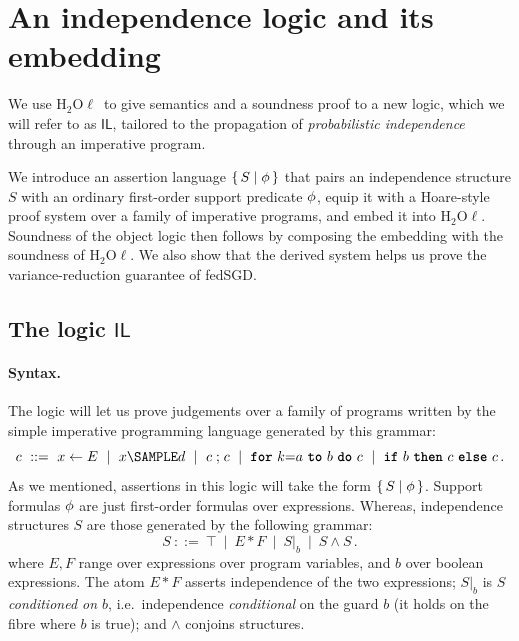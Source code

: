 \documentclass[11pt]{article}
\providecommand{\hoellora}{\textsf{H$\mbox{}_2$O$\ell$}\xspace}
\newcommand{\iHL}{\ensuremath{\mathsf{IL}}\xspace}   %
\newcommand{\iat}{\mathbin{\ast}}                 %
\newcommand{\smpl}{\SAMPLE}
\newcommand{\stp}{\mathrel{;}}
\newcommand{\restr}[2]{#1|_{#2}}                  %
\theoremstyle{plain}\newtheorem{lemma}{Lemma}\newtheorem{theorem}{Theorem}\newtheorem{corollary}{Corollary}
\theoremstyle{definition}\newtheorem{definition}{Definition}
\begin{document}
\section{An independence logic and its embedding}
\label{sec:il}

We use \hoellora\ to give semantics
and a soundness proof to a new logic, which we will refer to as \iHL, tailored to 
the propagation of \emph{probabilistic independence} through an imperative program. 

We introduce an
assertion language $\{\,S \mid \phi\,\}$ that pairs an independence structure
$S$ with an ordinary first-order support predicate $\phi$, equip it with a
Hoare-style proof system over a family of imperative programs, and embed it into
\hoellora. Soundness of the object logic 
then follows by composing the embedding
with the soundness of \hoellora. We also show that the derived
system helps us prove the variance-reduction guarantee of fedSGD.


\subsection{The logic \iHL}

\paragraph{Syntax.}
The logic will let us prove judgements over a family of programs written by the
simple imperative programming language generated by this grammar:
\[
  c \ ::=\ x\leftarrow E \ \mid\ x\smpl d \ \mid\ c\stp c
        \ \mid\ \kwd{for}\ k{=}a\ \kwd{to}\ b\ \kwd{do}\ c
        \ \mid\ \kwd{if}\ b\ \kwd{then}\ c\ \kwd{else}\ c\,.
\]
As we mentioned, assertions in this logic will take the form $\{\,S \mid \phi\,\}$.
Support formulas $\phi$ are just first-order formulas over expressions. Whereas, 
independence structures $S$ are those generated by the following grammar:
\[
  S \ ::=\ \top \ \mid\ E \iat F \ \mid\ \restr{S}{b} \ \mid\ S\land S\,.
\]
where $E,F$ range over expressions over program variables, and $b$ over boolean
expressions. The atom $E\iat F$ asserts independence of the two expressions; $\restr{S}{b}$ is
\emph{$S$ conditioned on $b$}, i.e.\ independence \emph{conditional} on the guard
$b$ (it holds on the fibre where $b$ is true); and $\land$ conjoins structures.
\end{document}
